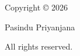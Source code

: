 \thispagestyle{empty}

\vspace*{\fill}

\begin{center}

Copyright © 2026

Pasindu Priyanjana

All rights reserved.

\end{center}

\vspace*{\fill}

\clearpage